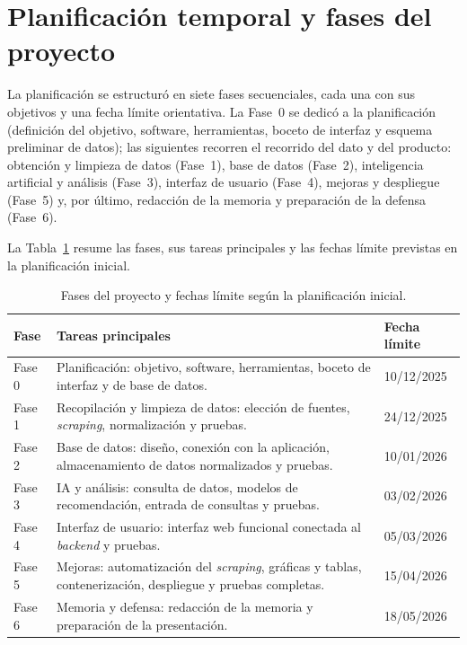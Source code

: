 \section{Planificación temporal y fases del proyecto}
\label{sec:met-planificacion}

La planificación se estructuró en siete fases secuenciales, cada una con sus
objetivos y una fecha límite orientativa. La Fase~0 se dedicó a la planificación
(definición del objetivo, software, herramientas, boceto de interfaz y esquema
preliminar de datos); las siguientes recorren el recorrido del dato y del
producto: obtención y limpieza de datos (Fase~1), base de datos (Fase~2),
inteligencia artificial y análisis (Fase~3), interfaz de usuario (Fase~4),
mejoras y despliegue (Fase~5) y, por último, redacción de la memoria y preparación
de la defensa (Fase~6).

La Tabla~\ref{tab:fases} resume las fases, sus tareas principales y las fechas
límite previstas en la planificación inicial.

\begin{table}[H]
\centering
\begin{tabular}{p{1.2cm}p{8.6cm}p{2.4cm}}
\hline
\textbf{Fase} & \textbf{Tareas principales} & \textbf{Fecha límite} \\
\hline
Fase 0 & Planificación: objetivo, software, herramientas, boceto de interfaz y de
         base de datos. & 10/12/2025 \\
Fase 1 & Recopilación y limpieza de datos: elección de fuentes, \emph{scraping},
         normalización y pruebas. & 24/12/2025 \\
Fase 2 & Base de datos: diseño, conexión con la aplicación, almacenamiento de
         datos normalizados y pruebas. & 10/01/2026 \\
Fase 3 & IA y análisis: consulta de datos, modelos de recomendación, entrada de
         consultas y pruebas. & 03/02/2026 \\
Fase 4 & Interfaz de usuario: interfaz web funcional conectada al \emph{backend}
         y pruebas. & 05/03/2026 \\
Fase 5 & Mejoras: automatización del \emph{scraping}, gráficas y tablas,
         contenerización, despliegue y pruebas completas. & 15/04/2026 \\
Fase 6 & Memoria y defensa: redacción de la memoria y preparación de la
         presentación. & 18/05/2026 \\
\hline
\end{tabular}
\caption{Fases del proyecto y fechas límite según la planificación inicial.}
\label{tab:fases}
\end{table}


